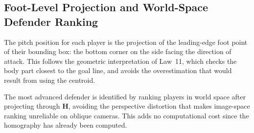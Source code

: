 \subsection{Foot-Level Projection and World-Space Defender Ranking}%
\label{sec:design_projection_choice}

The pitch position for each player is the projection of the leading-edge foot point of their bounding box: the bottom corner on the side facing the direction of attack. This follows the geometric interpretation of Law~11, which checks the body part closest to the goal line, and avoids the overestimation that would result from using the centroid.

The most advanced defender is identified by ranking players in world space after projecting through $\mathbf{H}$, avoiding the perspective distortion that makes image-space ranking unreliable on oblique cameras. This adds no computational cost since the homography has already been computed.
